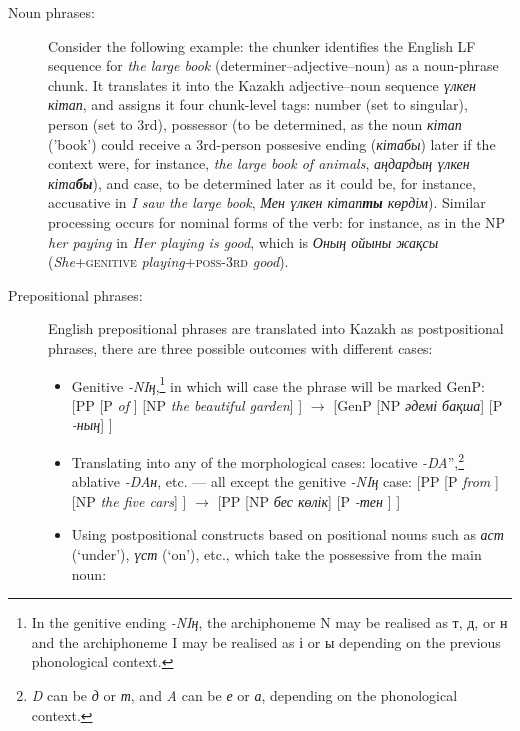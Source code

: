 \documentclass[11pt]{article}
\begin{document}
\begin{description}
\item[Noun phrases:] Consider the following example: the chunker identifies the English LF sequence for \emph{the large book}  (determiner--adjective--noun) as a noun-phrase chunk. It translates it into the Kazakh adjective--noun sequence \emph{үлкен кітап}, and assigns it four chunk-level tags: number (set to singular), person (set to 3rd), 
  possessor (to be determined, as the noun \emph{кітап} ('book') could receive a 3rd-person possesive 
  ending (\emph{кітабы}) later if the context were, for instance, \emph{the large book of animals}, \emph{аңдардың үлкен кіта\textbf{бы}}), 
  and case, to be determined later as it could be, for instance, accusative in \emph{I saw the large book}, \emph{Мен үлкен кітап\textbf{ты} көрдім}). Similar processing occurs for nominal forms of the verb: for instance, as in the NP \emph{her paying} in \emph{Her playing is good}, which is  \emph{Оның ойыны жақсы} (\emph{She}+\textsc{genitive} \emph{playing}+\textsc{poss-3rd} \emph{good}). 
\item[Prepositional phrases:] English prepositional phrases are translated into Kazakh as postpositional phrases, 
  there are three possible outcomes with different cases:
   \begin{itemize}
    \item Genitive \emph{-NIң},\footnote{In the genitive ending \emph{-{N}{I}ң}, the archiphoneme {N} may be realised as т, д, or н and the archiphoneme {I} may be realised as  і  or ы depending on the previous phonological context. } in which will case the phrase will be marked GenP:  
        [PP [P \emph{of} ] [NP \emph{the beautiful garden}] ] $\rightarrow$ [GenP [NP \emph{әдемі бақша}] [P \emph{-ның}] ] 
    \item Translating into any of the morphological cases: locative \emph{-{D}{A}}'',\footnote{\emph{D} can be \emph{д} or \emph{т}, and \emph{{A}} can be \emph{е} or \emph{а}, depending on the 
        phonological context.} ablative \emph{-{D}{A}н}, etc. --- all except the genitive \emph{-{N}{I}ң} case: 
        [PP [P \emph{from} ] [NP \emph{the five cars}] ] $\rightarrow$ [PP [NP \emph{бес көлік}] [P \emph{-тен} ] ]
    \item Using postpositional constructs based on positional nouns such as \emph{аст} (`under'), \emph{үст} (`on'), etc., which take the possessive from the main noun:  

\end{itemize}
\end{description}
\end{document}
